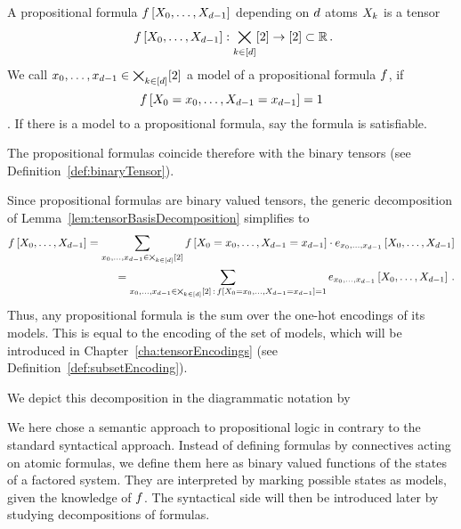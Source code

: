 \begin{definition}\label{def:formulas}
	A propositional formula $f\left[X_{0},\ldots,X_{d-1}\right]$ depending on $d$ atoms $X_{k}$ is a tensor
		\[ \formulaat{\catvariables} : \atomstates \rightarrow [2] \subset \rr \, . \]
	We call ${x_{0},\ldots,x_{d-1}} \in \bigtimes_{k\in[d]}[2]$ a model of a propositional formula $f$, if 
		\[ f\left[X_{0}=x_{0},\ldots,X_{d-1}=x_{d-1}\right]=1 \].
	If there is a model to a propositional formula, say the formula is satisfiable.
\end{definition}

The propositional formulas coincide therefore with the binary tensors (see Definition~\ref{def:binaryTensor}).


Since propositional formulas are binary valued tensors, the generic decomposition of Lemma~\ref{lem:tensorBasisDecomposition} simplifies to
\begin{align}\label{eq:formulaModelDecomposition}
	f\left[X_{0},\ldots,X_{d-1}\right] = \sum_{x_{0},\ldots,x_{d-1}\in\bigtimes_{k\in[d]}[2]} f\left[X_{0}=x_{0},\ldots,X_{d-1}=x_{d-1}\right] \cdot e_{x_{0},\ldots,x_{d-1}}\left[X_{0},\ldots,X_{d-1}\right] \\
	= \sum_{x_{0},\ldots,x_{d-1}\in\bigtimes_{k\in[d]}[2] \, : \, f\left[X_{0}=x_{0},\ldots,X_{d-1}=x_{d-1}\right]=1}  e_{x_{0},\ldots,x_{d-1}}\left[X_{0},\ldots,X_{d-1}\right] \, .
\end{align}
Thus, any propositional formula is the sum over the one-hot encodings of its models.
This is equal to the encoding of the set of models, which will be introduced in Chapter~\ref{cha:tensorEncodings} (see Definition~\ref{def:subsetEncoding}).

We depict this decomposition in the diagrammatic notation by
\begin{center}
	
\end{center}









We here chose a semantic approach to propositional logic in contrary to the standard syntactical approach.
Instead of defining formulas by connectives acting on atomic formulas, we define them here as binary valued functions of the states of a factored system.
They are interpreted by marking possible states as models, given the knowledge of $f$.
The syntactical side will then be introduced later by studying decompositions of formulas.


